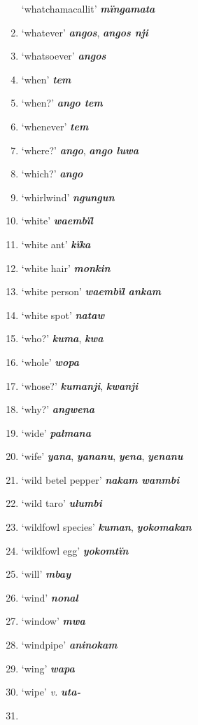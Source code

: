 \begin{enumerate}[noitemsep, label={}, align=left, widest=190, labelsep=1ex,leftmargin=*,itemindent=-10pt]
‘whatchamacallit’ \textbf{\textit{mïngamata}} \item
‘whatever’ \textbf{\textit{angos}}, \textbf{\textit{angos nji}} \item
‘whatsoever’ \textbf{\textit{angos}} \item
‘when’ \textbf{\textit{tem}} \item
‘when?’ \textbf{\textit{ango tem}} \item
‘whenever’ \textbf{\textit{tem}} \item
‘where?’ \textbf{\textit{ango}}, \textbf{\textit{ango luwa}} \item
‘which?’ \textbf{\textit{ango}} \item
‘whirlwind’ \textbf{\textit{ngungun}} \item
‘white’ \textbf{\textit{waembïl}} \item
‘white ant’ \textbf{\textit{kïka}} \item
‘white hair’ \textbf{\textit{monkin}} \item
‘white person’ \textbf{\textit{waembïl ankam}} \item
‘white spot’ \textbf{\textit{nataw}} \item
‘who?’ \textbf{\textit{kuma}}, \textbf{\textit{kwa}} \item
‘whole’ \textbf{\textit{wopa}} \item
‘whose?’ \textbf{\textit{kumanji}}, \textbf{\textit{kwanji}} \item
‘why?’ \textbf{\textit{angwena}} \item
‘wide’ \textbf{\textit{palmana}} \item
‘wife’ \textbf{\textit{yana}}, \textbf{\textit{yananu}}, \textbf{\textit{yena}}, \textbf{\textit{yenanu}} \item
‘wild betel pepper’ \textbf{\textit{nakam wanmbi}} \item
‘wild taro’ \textbf{\textit{ulumbi}} \item
‘wildfowl species’ \textbf{\textit{kuman}}, \textbf{\textit{yokomakan}} \item
‘wildfowl egg’ \textbf{\textit{yokomtïn}} \item
‘will’ \textbf{\textit{mbay}} \item
‘wind’ \textbf{\textit{nonal}} \item
‘window’ \textbf{\textit{mwa}} \item
‘windpipe’ \textbf{\textit{aninokam}} \item
‘wing’ \textbf{\textit{wapa}} \item
‘wipe’ \textit{v.} \textbf{\textit{uta-}} \item

\end{enumerate}
